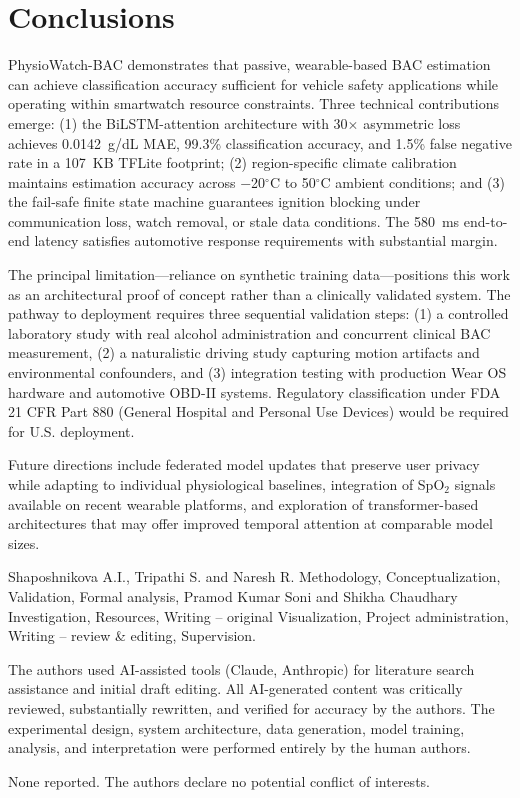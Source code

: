 \documentclass[HARVARD,Times2COL]{WileyNJDv5}
\begin{document}
\section{Conclusions}\label{sec5}
PhysioWatch-BAC demonstrates that passive, wearable-based BAC estimation can achieve classification accuracy sufficient for vehicle safety applications while operating within smartwatch resource constraints. Three technical contributions emerge: (1) the BiLSTM-attention architecture with 30$\times$ asymmetric loss achieves 0.0142~g/dL MAE, 99.3\% classification accuracy, and 1.5\% false negative rate in a 107~KB TFLite footprint; (2) region-specific climate calibration maintains estimation accuracy across $-$20$^\circ$C to 50$^\circ$C ambient conditions; and (3) the fail-safe finite state machine guarantees ignition blocking under communication loss, watch removal, or stale data conditions. The 580~ms end-to-end latency satisfies automotive response requirements with substantial margin.

The principal limitation---reliance on synthetic training data---positions this work as an architectural proof of concept rather than a clinically validated system. The pathway to deployment requires three sequential validation steps: (1) a controlled laboratory study with real alcohol administration and concurrent clinical BAC measurement, (2) a naturalistic driving study capturing motion artifacts and environmental confounders, and (3) integration testing with production Wear OS hardware and automotive OBD-II systems. Regulatory classification under FDA 21 CFR Part 880 (General Hospital and Personal Use Devices) would be required for U.S. deployment.

Future directions include federated model updates that preserve user privacy while adapting to individual physiological baselines, integration of SpO$_2$ signals available on recent wearable platforms, and exploration of transformer-based architectures that may offer improved temporal attention at comparable model sizes.



{}
Shaposhnikova A.I., Tripathi S. and Naresh R. Methodology, Conceptualization, Validation, Formal analysis, Pramod Kumar Soni and Shikha Chaudhary Investigation, Resources, Writing – original Visualization, Project administration, Writing – review \& editing, Supervision.

The authors used AI-assisted tools (Claude, Anthropic) for literature search assistance and initial draft editing. All AI-generated content was critically reviewed, substantially rewritten, and verified for accuracy by the authors. The experimental design, system architecture, data generation, model training, analysis, and interpretation were performed entirely by the human authors.

None reported.
The authors declare no potential conflict of interests.

\end{document}
